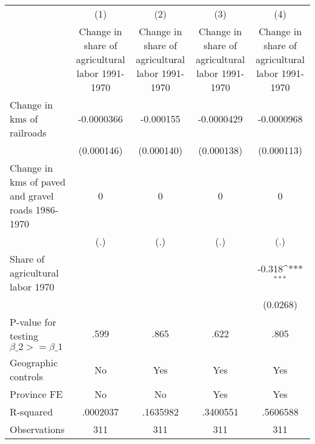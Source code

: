 {
\def\sym#1{\ifmmode^{#1}\else\(^{#1}\)\fi}
\begin{tabular}{l*{4}{c}}
\hline\hline
                &\multicolumn{1}{c}{(1)}&\multicolumn{1}{c}{(2)}&\multicolumn{1}{c}{(3)}&\multicolumn{1}{c}{(4)}\\
                &\multicolumn{1}{c}{Change in share of agricultural labor 1991-1970}&\multicolumn{1}{c}{Change in share of agricultural labor 1991-1970}&\multicolumn{1}{c}{Change in share of agricultural labor 1991-1970}&\multicolumn{1}{c}{Change in share of agricultural labor 1991-1970}\\
\hline
Change in kms of railroads&-0.0000366         &-0.000155         &-0.0000429         &-0.0000968         \\
                &(0.000146)         &(0.000140)         &(0.000138)         &(0.000113)         \\
[1em]
Change in kms of paved and gravel roads 1986-1970&        0         &        0         &        0         &        0         \\
                &      (.)         &      (.)         &      (.)         &      (.)         \\
[1em]
Share of agricultural labor 1970&                  &                  &                  &   -0.318\sym{***}\\
                &                  &                  &                  & (0.0268)         \\
\hline
P-value for testing $\beta\_{2} >= \beta\_{1}$&     .599         &     .865         &     .622         &     .805         \\
Geographic controls&       No         &      Yes         &      Yes         &      Yes         \\
Province FE     &       No         &       No         &      Yes         &      Yes         \\
R-squared       & .0002037         & .1635982         & .3400551         & .5606588         \\
Observations    &      311         &      311         &      311         &      311         \\
\hline\hline
\end{tabular}
}
